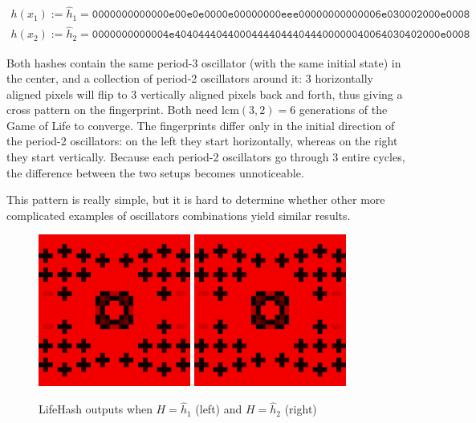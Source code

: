 \documentclass{article}
\begin{document}
\begin{align*}
h(x_1) := \hat{h}_1 =\texttt{0000000000000e00e0e0000e00000000eee00000000000006e030002000e0008} \\
h(x_2) := \hat{h}_2 =\texttt{0000000000004e404044404400044440444044400000040064030402000e0008}
\end{align*}

Both hashes contain the same period-3 oscillator (with the same initial state) in the center, and a collection of period-2 oscillators around it: 3 horizontally aligned pixels will flip to 3 vertically aligned pixels back and forth, thus giving a cross pattern on the fingerprint. Both need lcm$(3,2) = 6$ generations of the Game of Life to converge. The fingerprints differ only in the initial direction of the period-2 oscillators: on the left they start horizontally, whereas on the right they start vertically. Because each period-2 oscillators go through 3 entire cycles, the difference between the two setups becomes unnoticeable. 

This pattern is really simple, but it is hard to determine whether other more complicated examples of oscillators combinations yield similar results.


\begin{figure}
    \centering
    \includegraphics[width=5cm]{figures/ee3.png}
    \includegraphics[width=5cm]{figures/443.png}
    \caption{LifeHash outputs when $H = \hat{h}_1$ (left) and $H = \hat{h}_2$ (right)}
    \label{fig:lifehash}
\end{figure}
\end{document}
